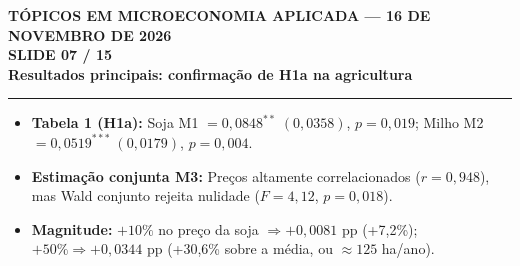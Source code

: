 \documentclass[11pt,a4paper]{article}
\newcommand{\slidenum}{1}
\begin{document}
\newpage

\renewcommand{\slidenum}{7}
\noindent
\begin{minipage}{\textwidth}
\begin{center}
{\color{cinza}\footnotesize\textbf{TÓPICOS EM MICROECONOMIA APLICADA --- 16 DE NOVEMBRO DE 2026}\\[1.2mm]}
{\color{cinza}\bfseries\Large SLIDE 07 / 15\\[1.5mm]}
{\color{verde}\bfseries\LARGE Resultados principais: confirmação de H1a na agricultura\\[2.5mm]}
\rule{\textwidth}{1pt}
\end{center}
\end{minipage}
\vspace{1.5mm}

\begin{tcolorbox}[title={\bfseries\small ÂNCORAS EMPÍRICAS E CONCEITUAIS DO SLIDE}]
\begin{itemize}[leftmargin=*,itemsep=1mm,topsep=0.5mm]
    \item \textbf{Tabela 1 (H1a):} Soja M1 $= 0{,}0848^{**}\;(0{,}0358)$, $p=0{,}019$; Milho M2 $= 0{,}0519^{***}\;(0{,}0179)$, $p=0{,}004$.
    \item \textbf{Estimação conjunta M3:} Preços altamente correlacionados ($r = 0{,}948$), mas Wald conjunto rejeita nulidade ($F = 4{,}12$, $p = 0{,}018$).
    \item \textbf{Magnitude:} $+10\%$ no preço da soja $\Rightarrow +0{,}0081$ pp (+7,2\%); $+50\% \Rightarrow +0{,}0344$ pp (+30,6\% sobre a média, ou $\approx 125$ ha/ano).
\end{itemize}
\end{tcolorbox}
\vspace{2mm}
\end{document}
